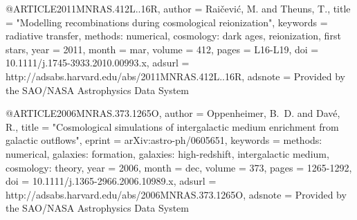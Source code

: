 \documentclass{article}
\begin{document}
@ARTICLE{2011MNRAS.412L..16R,
   author = {{Rai{\v c}evi{\'c}}, M. and {Theuns}, T.},
    title = "{Modelling recombinations during cosmological reionization}",
 keywords = {radiative transfer, methods: numerical, cosmology: dark ages, reionization, first stars},
     year = 2011,
    month = mar,
   volume = 412,
    pages = {L16-L19},
      doi = {10.1111/j.1745-3933.2010.00993.x},
   adsurl = {http://adsabs.harvard.edu/abs/2011MNRAS.412L..16R},
  adsnote = {Provided by the SAO/NASA Astrophysics Data System}
}

@ARTICLE{2006MNRAS.373.1265O,
   author = {{Oppenheimer}, B.~D. and {Dav{\'e}}, R.},
    title = "{Cosmological simulations of intergalactic medium enrichment from galactic outflows}",
   eprint = {arXiv:astro-ph/0605651},
 keywords = {methods: numerical, galaxies: formation, galaxies: high-redshift, intergalactic medium, cosmology: theory},
     year = 2006,
    month = dec,
   volume = 373,
    pages = {1265-1292},
      doi = {10.1111/j.1365-2966.2006.10989.x},
   adsurl = {http://adsabs.harvard.edu/abs/2006MNRAS.373.1265O},
  adsnote = {Provided by the SAO/NASA Astrophysics Data System}
}
\end{document}

